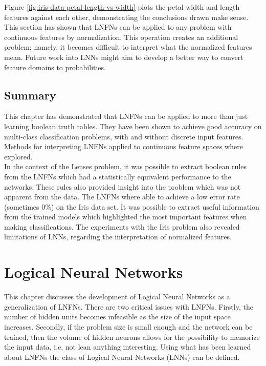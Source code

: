 Figure \ref{fig:iris-data-petal-length-vs-width} plots the petal width and length features against each other, demonstrating the conclusions drawn make sense.\\

This section has shown that LNFNs can be applied to any problem with continuous features by normalization. This operation creates an additional problem; namely, it becomes difficult to interpret what the normalized features mean. Future work into LNNs might aim to develop a better way to convert feature domains to probabilities.

\section{Summary}
This chapter has demonstrated that LNFNs can be applied to more than just learning boolean truth tables. They have been shown to achieve good accuracy on multi-class classification problems, with and without discrete input features. Methods for interpreting LNFNs applied to continuous feature spaces where explored.\\

In the context of the Lenses problem, it was possible to extract boolean rules from the LNFNs which had a statistically equivalent performance to the networks. These rules also provided insight into the problem which was not apparent from the data. The LNFNs where able to achieve a low error rate (sometimes 0\%) on the Iris data set. It was possible to extract useful information from the trained models which highlighted the most important features when making classifications. The experiments with the Iris problem also revealed limitations of LNNs, regarding the interpretation of normalized features.

\chapter{Logical Neural Networks} \label{C:lnn}
This chapter discusses the development of Logical Neural Networks as a generalization of LNFNs. There are two critical issues with LNFNs. Firstly, the number of hidden units becomes infeasible as the size of the input space increases. Secondly, if the problem size is small enough and the network can be trained, then the volume of hidden neurons allows for the possibility to memorize the input data, i.e, not lean anything interesting. Using what has been learned about LNFNs the class of Logical Neural Networks (LNNs) can be defined.

